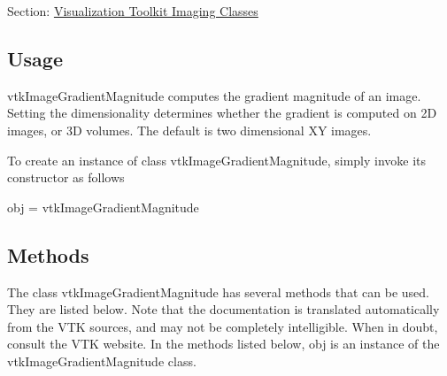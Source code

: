 Section\-: \hyperlink{sec_vtkimaging}{Visualization Toolkit Imaging Classes} \hypertarget{vtkwidgets_vtkxyplotwidget_Usage}{}\subsection{Usage}\label{vtkwidgets_vtkxyplotwidget_Usage}
vtk\-Image\-Gradient\-Magnitude computes the gradient magnitude of an image. Setting the dimensionality determines whether the gradient is computed on 2\-D images, or 3\-D volumes. The default is two dimensional X\-Y images.

To create an instance of class vtk\-Image\-Gradient\-Magnitude, simply invoke its constructor as follows \begin{DoxyVerb}  obj = vtkImageGradientMagnitude
\end{DoxyVerb}
 \hypertarget{vtkwidgets_vtkxyplotwidget_Methods}{}\subsection{Methods}\label{vtkwidgets_vtkxyplotwidget_Methods}
The class vtk\-Image\-Gradient\-Magnitude has several methods that can be used. They are listed below. Note that the documentation is translated automatically from the V\-T\-K sources, and may not be completely intelligible. When in doubt, consult the V\-T\-K website. In the methods listed below, {\ttfamily obj} is an instance of the vtk\-Image\-Gradient\-Magnitude class. 
